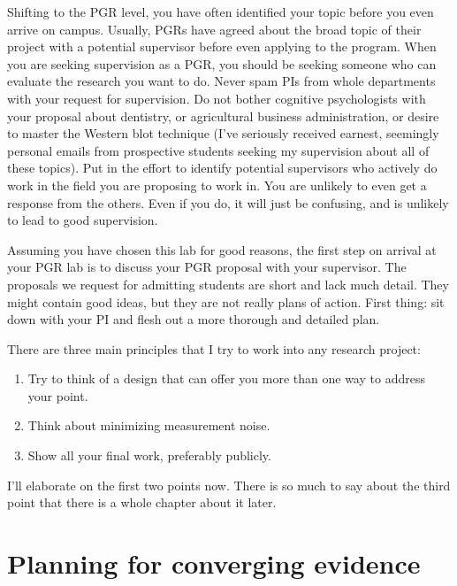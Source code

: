\documentclass[
  12pt,
]{book}
\begin{document}
Shifting to the PGR level, you have often identified your topic before you even arrive on campus. Usually, PGRs have agreed about the broad topic of their project with a potential supervisor before even applying to the program. When you are seeking supervision as a PGR, you should be seeking someone who can evaluate the research you want to do. Never spam PIs from whole departments with your request for supervision. Do not bother cognitive psychologists with your proposal about dentistry, or agricultural business administration, or desire to master the Western blot technique (I've seriously received earnest, seemingly personal emails from prospective students seeking my supervision about all of these topics). Put in the effort to identify potential supervisors who actively do work in the field you are proposing to work in. You are unlikely to even get a response from the others. Even if you do, it will just be confusing, and is unlikely to lead to good supervision.

Assuming you have chosen this lab for good reasons, the first step on arrival at your PGR lab is to discuss your PGR proposal with your supervisor. The proposals we request for admitting students are short and lack much detail. They might contain good ideas, but they are not really plans of action. First thing: sit down with your PI and flesh out a more thorough and detailed plan.

There are three main principles that I try to work into any research project:

\begin{enumerate}
\def\labelenumi{\arabic{enumi}.}
\item
  Try to think of a design that can offer you more than one way to address your point.
\item
  Think about minimizing measurement noise.
\item
  Show all your final work, preferably publicly.
\end{enumerate}

I'll elaborate on the first two points now. There is so much to say about the third point that there is a whole chapter about it later.

\section{Planning for converging evidence}\label{planning-for-converging-evidence}
\end{document}

